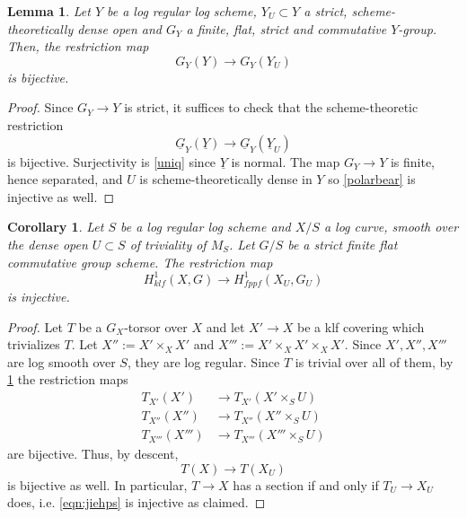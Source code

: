 \documentclass[a4paper,11pt]{amsart} %
\numberwithin{equation}{subsection}
\newcommand{\ul}[1]{{\underline{#1}}}
\theoremstyle{definition}
\theoremstyle{plain}%
\newtheorem{lemma}[definition]{Lemma}
\newtheorem{corollary}[definition]{Corollary}
\theoremstyle{remark}
\begin{document}
\begin{lemma}\label{lemma:restriction_group_is_bijective}
    Let $Y$ be a log regular log scheme, $Y_U\subset Y$ a strict, scheme-theoretically dense open and $G_Y$ a finite, flat, strict and commutative $Y$-group. Then, the restriction map
    \begin{equation*}
        G_Y(Y) \to G_Y(Y_U)
    \end{equation*}
    is bijective.
\end{lemma}

\begin{proof}
    Since $G_Y \to Y$ is strict, it suffices to check that the scheme-theoretic restriction
    \begin{equation}\label{polarbear}
        \ul G_Y(\ul Y) \to \ul G_Y(\ul Y_U)
    \end{equation}
    is bijective. Surjectivity is \ref{uniq} since $\ul Y$ is normal. The map $G_Y \to Y$ is finite, hence separated, and $U$ is scheme-theoretically dense in $Y$ so \ref{polarbear} is injective as well.
\end{proof}


\begin{corollary}\label{Uniqueness}
   Let $S$ be a log regular log scheme and $X/S$ a log curve, smooth over the dense open $U\subset S$ of triviality of $M_S$. Let $G/S$ be a strict finite flat commutative group scheme. The restriction map
   \begin{equation}\label{eqn:jiehps}
       H^1_{klf}(X,G) \to H^1_{fppf}(X_U,G_U)
   \end{equation}
   is injective.
\end{corollary}



\begin{proof}
Let $T$ be a $G_X$-torsor over $X$ and let $X' \to X$ be a klf covering which trivializes $T$. Let $X'':=X'\times_X X'$ and $X''':=X'\times_X X' \times_X X'$. Since $X',X'',X'''$ are log smooth over $S$, they are log regular. Since $T$ is trivial over all of them, by \ref{lemma:restriction_group_is_bijective} the restriction maps
\begin{align*}
    T_{X'}(X') & \to T_{X'}(X'\times_S U) \\
    T_{X''}(X'') & \to T_{X''}(X''\times_S U) \\
    T_{X'''}(X''') & \to T_{X'''}(X'''\times_S U)
\end{align*}
are bijective. Thus, by descent, 
\begin{equation}\label{penguin}
   T(X) \to T(X_U)
\end{equation}
is bijective as well. In particular, $T \to X$ has a section if and only if $T_U \to X_U$ does, i.e. \ref{eqn:jiehps} is injective as claimed.
\end{proof}
\end{document}
